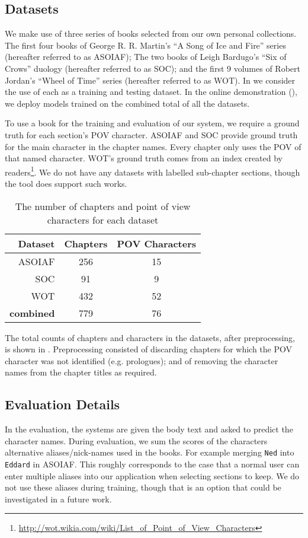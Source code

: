 \documentclass[11pt,a4paper]{article}
\begin{document}
\subsection{Datasets}
We make use of three series of books selected from our own personal collections.
The first four books of George R. R. Martin's ``A Song of Ice and Fire'' series (hereafter referred to as ASOIAF);
The two books of  Leigh Bardugo's ``Six of Crows'' duology (hereafter referred to as SOC);
and the first 9 volumes of Robert Jordan's ``Wheel of Time'' series (hereafter referred to as WOT).
In  we consider the use of each as a training and testing dataset.
In the online demonstration (), we deploy models trained on the combined total of all the datasets.

To use a book for the training and evaluation of our system, we require a ground truth for each section's POV character.
ASOIAF and SOC provide ground truth for the main character in the chapter names.
Every chapter only uses the POV of that named character.
WOT's ground truth comes from an index created by readers\footnote{\url{http://wot.wikia.com/wiki/List_of_Point_of_View_Characters}}.
We do not have any datasets with labelled sub-chapter sections, though the tool does support such works.


\begin{table}
	\begin{tabular}{rcc}
		Dataset & Chapters & POV Characters\\
		\toprule
		ASOIAF  & 256	&	15\\
		SOC		& 91	&	9\\
		WOT     & 432   &   52\\
		\midrule
		\textbf{combined}  &  779 & 76
	\end{tabular}
	\caption{The number of chapters and point of view characters for each dataset \label{tbl:datasets}}
\end{table}

The total counts of chapters and characters in the datasets, after preprocessing, is shown in .
Preprocessing consisted of  discarding chapters for which the POV character was not identified (e.g. prologues); and of removing the character names from the chapter titles as required.

\subsection{Evaluation Details}
In the evaluation, the systems are given the body text and asked to predict the character names.
During evaluation, we sum the scores of the characters alternative aliases/nick-names used in the  books.
For example merging \texttt{Ned} into \texttt{Eddard} in ASOIAF.
This roughly corresponds to the case that a normal user can enter multiple aliases into our application when selecting sections to keep.
We do not use these aliases during training, though that is an option that could be investigated in a future work.
\end{document}
